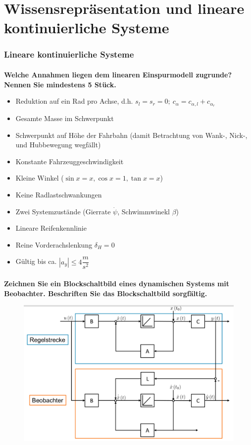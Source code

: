 \setcounter{section}{0}
\part{Wissensrepräsentation und lineare kontinuierliche Systeme}
\section{Lineare kontinuierliche Systeme}
\subsection{}
\textbf{Welche Annahmen liegen dem linearen Einspurmodell zugrunde? Nennen Sie mindestens 5 Stück.}
\begin{itemize}
    \item Reduktion auf ein Rad pro Achse, d.h. $s_l=s_r=0;\ c_{\alpha}=c_{\alpha,l}+c_{\alpha_r}$
    \item Gesamte Masse im Schwerpunkt
    \item Schwerpunkt auf Höhe der Fahrbahn (damit Betrachtung von Wank-, Nick-, und Hubbewegung wegfällt)
    \item Konstante Fahrzeuggeschwindigkeit
    \item Kleine Winkel ($\sin x=x, \cos x=1, \tan x=x$)
    \item Keine Radlastschwankungen
    \item Zwei Systemzustände (Gierrate $\dot{\psi}$, Schwimmwinekl $\beta$)
    \item Lineare Reifenkennlinie
    \item Reine Vorderachslenkung $\delta_H=0$
    \item Gültig bis ca. $|a_y|\leq4\dfrac{m}{s^2}$
\end{itemize}

\subsection{}
\textbf{Zeichnen Sie ein Blockschaltbild eines dynamischen Systems mit Beobachter. Beschriften Sie das Blockschaltbild sorgfältig.}
\begin{figure}[H]
    \centering
    \includegraphics[width=.5\linewidth]{Graphics/beobrachter_blockbild.png}
\end{figure}
